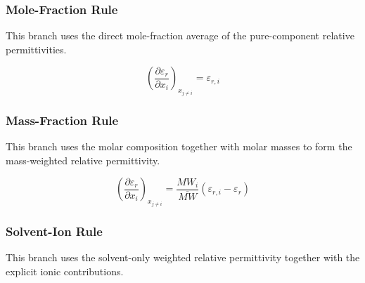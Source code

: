 \documentclass[12pt, letterpaper]{article}
\begin{document}
\subsubsection{Mole-Fraction Rule}

This branch uses the direct mole-fraction average of the pure-component relative permittivities.

\begin{equation}
    \left(\frac{\partial \varepsilon_{r}}{\partial x_{i}}\right)_{x_{j\neq i}}
    = \varepsilon_{r, i}
    \label{eq:depsr_dxi_mole}
\end{equation}

\subsubsection{Mass-Fraction Rule}

This branch uses the molar composition together with molar masses to form the mass-weighted relative permittivity.

\begin{equation}
    \left(\frac{\partial \varepsilon_{r}}{\partial x_{i}}\right)_{x_{j\neq i}}
    =
    \frac{MW_{i}}{\overline{MW}}\left(\varepsilon_{r,i}-\varepsilon_{r}\right)
    \label{eq:depsr_dxi_mass}
\end{equation}

\subsubsection{Solvent-Ion Rule}

This branch uses the solvent-only weighted relative permittivity together with the explicit ionic contributions.
\end{document}
